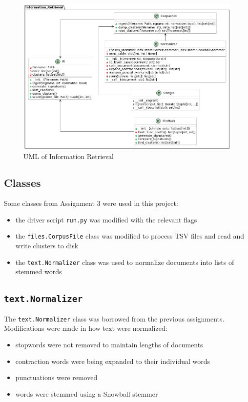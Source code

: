 \documentclass[11pt]{article}
\begin{document}
\begin{figure}[!ht]
  \includegraphics[scale=0.45]{statics/uml.png}
  \centering
  \caption{UML of Information Retrieval}
\end{figure}

\subsection{Classes}
Some classes from Assignment 3 were used in this project:
\begin{itemize}
  \item the driver script \texttt{run.py} was modified with the relevant flags
  \item the \texttt{files.CorpusFile} class was modified to process TSV files and read and write clusters to disk
  \item the \texttt{text.Normalizer} class was used to normalize documents into lists of stemmed words
\end{itemize}

\subsection{\texttt{text.Normalizer}}
The \texttt{text.Normalizer} class was borrowed from the previous assignments. Modifications were made in how text were normalized:
\begin{itemize}
  \item stopwords were not removed to maintain lengths of documents
  \item contraction words were being expanded to their individual words
  \item punctuations were removed
  \item words were stemmed using a Snowball stemmer
\end{itemize}
\end{document}
